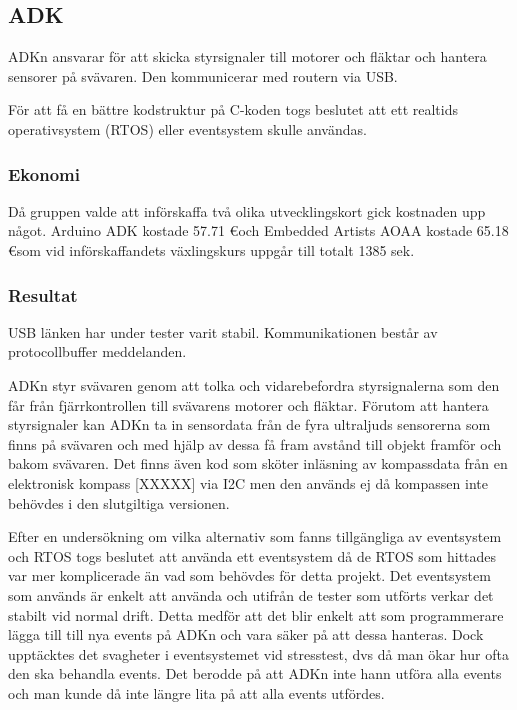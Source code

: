 \subsection{ADK}
ADKn ansvarar för att skicka styrsignaler till motorer och fläktar och hantera sensorer på svävaren. 
Den kommunicerar med routern via USB.

För att få en bättre kodstruktur på C-koden togs beslutet att ett realtids operativsystem (RTOS) 
eller eventsystem skulle användas.

\subsubsection{Ekonomi}
Då gruppen valde att införskaffa två olika utvecklingskort gick kostnaden upp något. Arduino ADK kostade 57.71 \euro och 
Embedded Artists AOAA kostade 65.18 \euro som vid införskaffandets växlingskurs uppgår till totalt 1385 sek. 

\subsubsection{Resultat}
USB länken har under tester varit stabil.
Kommunikationen består av protocollbuffer meddelanden.

ADKn styr svävaren genom att tolka och vidarebefordra styrsignalerna 
som den får från fjärrkontrollen till svävarens motorer och fläktar. 
Förutom att hantera styrsignaler kan ADKn ta in sensordata från de fyra ultraljuds 
sensorerna som finns på svävaren och med hjälp av dessa få fram avstånd till objekt framför och bakom svävaren.
Det finns även kod som sköter inläsning av kompassdata från en elektronisk kompass [XXXXX] via I2C men den 
används ej då kompassen inte behövdes i den slutgiltiga versionen.

Efter en undersökning om vilka alternativ som fanns tillgängliga av eventsystem och RTOS togs beslutet 
att använda ett eventsystem då de RTOS som hittades var mer komplicerade än vad som behövdes för detta projekt.
Det eventsystem som används är enkelt att använda och utifrån de tester som utförts verkar det stabilt vid normal drift. 
Detta medför att det blir enkelt att som programmerare lägga till till nya events på ADKn och 
vara säker på att dessa hanteras. 
Dock upptäcktes det svagheter i eventsystemet vid stresstest, dvs då man ökar hur ofta den ska behandla events. 
Det berodde på att ADKn inte hann utföra alla events och man kunde då inte längre lita på att alla events utfördes.

